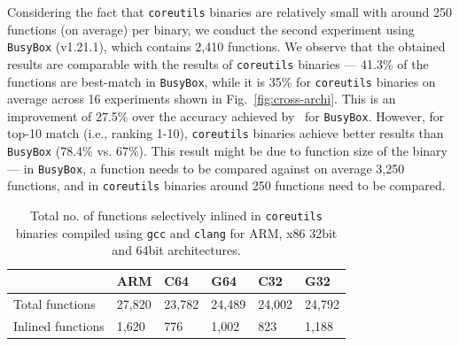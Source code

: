 Considering the fact that \texttt{coreutils} binaries are relatively small with around 250 functions (on average) per binary, we conduct the second experiment using \texttt{BusyBox} (v1.21.1), which contains 2,410 functions.
We observe that the obtained results are comparable with the results of \texttt{coreutils} binaries --- 41.3\% of the functions are best-match in \texttt{BusyBox}, while it is 35\% for \texttt{coreutils} binaries on average across 16 experiments shown in Fig.~\ref{fig:cross-archi}. This is an improvement of 27.5\% over the accuracy achieved by~\cite{DBLP:conf/sp/PewnyGGRH15} for \texttt{BusyBox}.
However, for top-10 match (i.e., ranking 1-10), \texttt{coreutils} binaries achieve better results than \texttt{BusyBox} (78.4\% vs. 67\%). This result might be due to function size of the binary --- in \texttt{BusyBox}, a function needs to be compared against on average 3,250 functions, and in \texttt{coreutils} binaries around 250  functions need to be compared. %

\begin{table}[t]
\scriptsize
\centering
\caption{Total no. of functions selectively inlined in \texttt{coreutils} binaries compiled using \texttt{gcc} and \texttt{clang} for ARM, x86 32bit and 64bit architectures. }
\label{cross-archi-inline}
\begin{tabular}{@{}llllll@{}}
\toprule
                                         & ARM                        & C64                        & G64                        & C32                        & G32                        \\ \midrule
\multicolumn{1}{l|}{Total functions}     & \multicolumn{1}{l|}{27,820} & \multicolumn{1}{l|}{23,782} & \multicolumn{1}{l|}{24,489} & \multicolumn{1}{l|}{24,002} & \multicolumn{1}{l|}{24,792} \\ \cmidrule(l){2-6}
\multicolumn{1}{l|}{Inlined functions}   & \multicolumn{1}{l|}{1,620}  & \multicolumn{1}{l|}{776}   & \multicolumn{1}{l|}{1,002}  & \multicolumn{1}{l|}{823}   & \multicolumn{1}{l|}{1,188}  \\ \bottomrule
\end{tabular}
\end{table}


